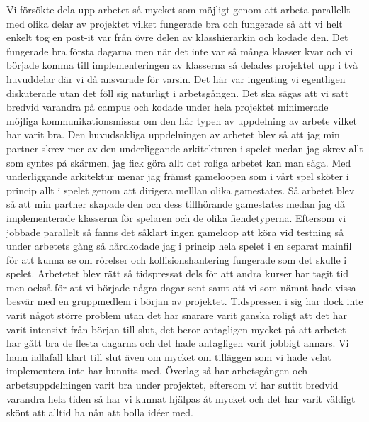 \documentclass{TDP003mall}
\begin{document}
Vi försökte dela upp arbetet så mycket som möjligt genom att arbeta parallellt med olika delar av projektet vilket fungerade bra och 
fungerade så att vi helt enkelt tog en post-it var från övre delen av klasshierarkin och kodade den. Det fungerade bra första
dagarna men när det inte var så många klasser kvar och vi började komma till implementeringen av klasserna så delades projektet
upp i två huvuddelar där vi då ansvarade för varsin. Det här var ingenting vi egentligen diskuterade utan det föll sig naturligt
i arbetsgången. Det ska sägas att vi satt bredvid varandra på campus och kodade under hela projektet  minimerade möjliga
kommunikationsmissar om den här typen av uppdelning av arbete vilket har varit bra.\newline \newline 
Den huvudsakliga uppdelningen av arbetet blev så att jag min partner skrev mer av den underliggande arkitekturen i spelet medan
jag skrev allt som syntes på skärmen, jag fick göra allt det roliga arbetet kan man säga. Med underliggande arkitektur
menar jag främst gameloopen som i vårt spel sköter i princip allt i spelet genom att dirigera melllan olika gamestates.
Så arbetet blev så att min partner skapade den och dess tillhörande gamestates medan jag då implementerade klasserna för
spelaren och de olika fiendetyperna. Eftersom vi jobbade parallelt så fanns det såklart ingen gameloop att köra vid testning
så under arbetets gång så hårdkodade jag i princip hela spelet i en separat mainfil för att kunna se om rörelser och kollisionshantering
fungerade som det skulle i spelet.\newline \newline 
Arbetetet blev rätt så tidspressat dels för att andra kurser har tagit tid men också för att vi började några dagar sent samt att vi som 
nämnt hade vissa besvär med en gruppmedlem i början av projektet. Tidspressen i sig har dock inte varit något större problem utan det har snarare varit ganska 
roligt att det har varit intensivt från början till slut, det beror antagligen mycket på att arbetet har gått bra de flesta dagarna och det hade
antagligen varit jobbigt annars. Vi hann iallafall klart till slut även om mycket om tilläggen som vi hade velat implementera inte har hunnits 
med.\newline
Överlag så har arbetsgången och arbetsuppdelningen varit bra under projektet, eftersom vi har suttit bredvid varandra hela tiden så
har vi kunnat hjälpas åt mycket och det har varit väldigt skönt att alltid ha nån att bolla idéer med. 
\newpage
\end{document}
